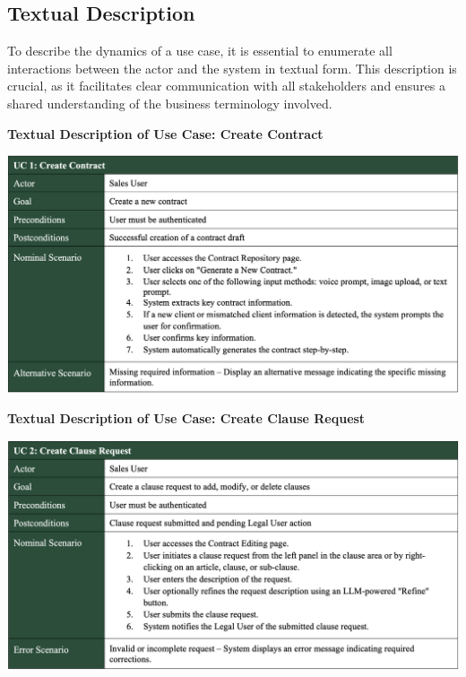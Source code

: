 \subsection{Textual Description}

To describe the dynamics of a use case, it is essential to enumerate all interactions between the actor and the system in textual form. This description is crucial, as it facilitates clear communication with all stakeholders and ensures a shared understanding of the business terminology involved.\newpage

\textbf{Textual Description of Use Case: Create Contract}\vspace{-0.3cm}

\begin{center}
    \centering
    \includegraphics[width=1\textwidth]{Images/Create Contract Use Case.png}
    \label{tab:create_contract_use_case}
\end{center}

\vspace{0.3cm}

\textbf{Textual Description of Use Case: Create Clause Request}\vspace{-0.3cm}

\begin{center}
    \centering
    \includegraphics[width=1\textwidth]{Images/Create Clause Request Use Case.png}
    \label{tab:create_clause_request_use_case}
\end{center}

